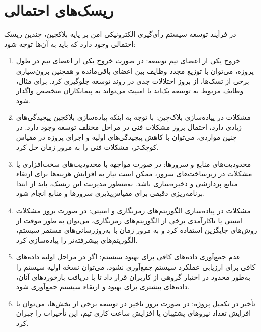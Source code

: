 \documentclass[12pt]{article}
\begin{document}
\section{ریسک‌های احتمالی}
در فرآیند توسعه سیستم رأی‌گیری الکترونیکی امن بر پایه بلاکچین، چندین ریسک احتمالی وجود دارد که باید به آن‌ها توجه شود:
\begin{enumerate}[label = (\arabic*), leftmargin = *]
\item
خروج یکی از اعضای تیم توسعه: در صورت خروج یکی از اعضای تیم در طول پروژه، می‌توان با توزیع مجدد وظایف بین اعضای باقی‌مانده و همچنین برون‌سپاری برخی از تسک‌ها، از بروز اختلالات جدی در روند توسعه جلوگیری کرد. برای مثال، وظایف مربوط به توسعه بک‌اند یا امنیت می‌تواند به پیمانکاران متخصص واگذار شود.
\item
مشکلات در پیاده‌سازی بلاک‌چین: با توجه به اینکه پیاده‌سازی بلاکچین پیچیدگی‌های زیادی دارد، احتمال بروز مشکلات فنی در مراحل مختلف توسعه وجود دارد. در چنین مواردی، می‌توان با کاهش پیچیدگی‌های اولیه و اجرای پروژه در مقیاس کوچک‌تر، مشکلات فنی را به مرور زمان حل کرد.
\item
محدودیت‌های منابع و سرورها: در صورت مواجهه با محدودیت‌های سخت‌افزاری یا مشکلات در زیرساخت‌های سرور، ممکن است نیاز به افزایش هزینه‌ها برای ارتقاء منابع پردازشی و ذخیره‌سازی باشد. به‌منظور مدیریت این ریسک، باید از ابتدا برنامه‌ریزی دقیقی برای مقیاس‌پذیری سرورها و منابع انجام شود.
\item
مشکلات در پیاده‌سازی الگوریتم‌های رمزنگاری و امنیتی: در صورت بروز مشکلات امنیتی یا ناکارآمدی برخی از الگوریتم‌های رمزنگاری، می‌توان به طور موقت از روش‌های جایگزین استفاده کرد و به مرور زمان با به‌روزرسانی‌های مستمر سیستم، الگوریتم‌های پیشرفته‌تر را پیاده‌سازی کرد.
\item
عدم جمع‌آوری داده‌های کافی برای بهبود سیستم: اگر در مراحل اولیه داده‌های کافی برای ارزیابی عملکرد سیستم جمع‌آوری نشود، می‌توان نسخه اولیه سیستم را به‌طور محدود در اختیار گروهی از کاربران قرار داد تا با دریافت بازخوردهای آنان، داده‌های بیشتری برای بهبود و ارتقاء سیستم جمع‌آوری شود.
\item
تأخیر در تکمیل پروژه: در صورت بروز تأخیر در توسعه برخی از بخش‌ها، می‌توان با افزایش تعداد نیروهای پشتیبان یا افزایش ساعت کاری تیم، این تأخیرات را جبران کرد.
\end{enumerate}
\end{document}
